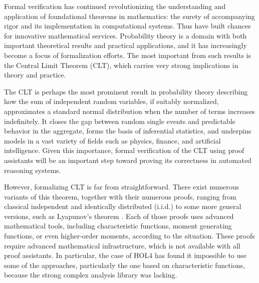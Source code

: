 
Formal verification has continued revolutionizing the understanding and application of foundational theorems in mathematics: the surety of accompanying rigor and its implementation in computational systems. Thus have built chances for innovative mathematical services. Probability theory is a domain with both important theoretical results and practical applications, and it has increasingly become a focus of formalization efforts. The most important from such results is the Central Limit Theorem (CLT), which carries very strong implications in theory and practice.

The CLT is perhaps the most prominent result in probability theory describing how the sum of independent random variables, if suitably normalized, approximates a standard normal distribution when the number of terms increases indefinitely. It closes the gap between random single events and predictable behavior in the aggregate, forms the basis of inferential statistics, and underpins models in a vast variety of fields such as physics, finance, and artificial intelligence. Given this importance, formal verification of the CLT using proof assistants will be an important step toward proving its correctness in automated reasoning systems.

However, formalizing CLT is far from straightforward. There exist numerous variants of this theorem, together with their numerous proofs, ranging from classical independent and identically distributed (i.i.d.) to some more general versions, such as Lyapunov's theorem \cite{billingsley2017probability}. Each of those proofs uses advanced mathematical tools, including characteristic functions, moment generating functions, or even higher-order moments, according to the situation. These proofs require advanced mathematical infrastructure, which is not available with all proof assistants. In particular, the case of HOL4 \cite{slind2008brief} has found it impossible to use some of the approaches, particularly the one based on characteristic functions, because the strong complex analysis library was lacking.


